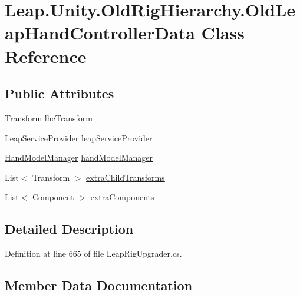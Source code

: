 \hypertarget{class_leap_1_1_unity_1_1_old_rig_hierarchy_1_1_old_leap_hand_controller_data}{}\section{Leap.\+Unity.\+Old\+Rig\+Hierarchy.\+Old\+Leap\+Hand\+Controller\+Data Class Reference}
\label{class_leap_1_1_unity_1_1_old_rig_hierarchy_1_1_old_leap_hand_controller_data}
\subsection*{Public Attributes}
\begin{DoxyCompactItemize}
\item 
Transform \mbox{\hyperlink{class_leap_1_1_unity_1_1_old_rig_hierarchy_1_1_old_leap_hand_controller_data_a30da5c72960cdc56b84358995a98cfb4}{lhc\+Transform}}
\item 
\mbox{\hyperlink{class_leap_1_1_unity_1_1_leap_service_provider}{Leap\+Service\+Provider}} \mbox{\hyperlink{class_leap_1_1_unity_1_1_old_rig_hierarchy_1_1_old_leap_hand_controller_data_a06731cc5d6edecb981eff99f75a71185}{leap\+Service\+Provider}}
\item 
\mbox{\hyperlink{class_leap_1_1_unity_1_1_hand_model_manager}{Hand\+Model\+Manager}} \mbox{\hyperlink{class_leap_1_1_unity_1_1_old_rig_hierarchy_1_1_old_leap_hand_controller_data_ae0983b15b4bcd2f34786b30dd2a8de81}{hand\+Model\+Manager}}
\item 
List$<$ Transform $>$ \mbox{\hyperlink{class_leap_1_1_unity_1_1_old_rig_hierarchy_1_1_old_leap_hand_controller_data_a2048e2d234553048b98e5cce12027741}{extra\+Child\+Transforms}}
\item 
List$<$ Component $>$ \mbox{\hyperlink{class_leap_1_1_unity_1_1_old_rig_hierarchy_1_1_old_leap_hand_controller_data_aa5a52b8e1a4ac9f1f3ac3ffd445278be}{extra\+Components}}
\end{DoxyCompactItemize}


\subsection{Detailed Description}


Definition at line 665 of file Leap\+Rig\+Upgrader.\+cs.



\subsection{Member Data Documentation}
\mbox{\label{class_leap_1_1_unity_1_1_old_rig_hierarchy_1_1_old_leap_hand_controller_data_a2048e2d234553048b98e5cce12027741}} 
